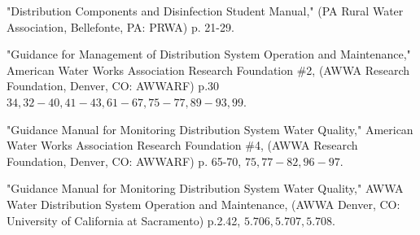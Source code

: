 \documentclass[10pt]{article}
\begin{document}
"Distribution Components and Disinfection Student Manual," (PA Rural Water Association, Bellefonte, PA: PRWA) p. 21-29.

"Guidance for Management of Distribution System Operation and Maintenance," American Water Works Association Research Foundation \#2, (AWWA Research Foundation, Denver, CO: AWWARF) p.30$34,32-40,41-43,61-67,75-77,89-93,99$.

"Guidance Manual for Monitoring Distribution System Water Quality," American Water Works Association Research Foundation \#4, (AWWA Research Foundation, Denver, CO: AWWARF) p. 65-70, $75,77-82,96-97$.

"Guidance Manual for Monitoring Distribution System Water Quality," AWWA Water Distribution System Operation and Maintenance, (AWWA Denver, CO: University of California at Sacramento) p.2.42, $5.706,5.707,5.708$.
\end{document}
